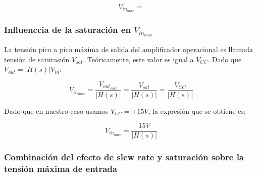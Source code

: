 \begin{equation}
	V_{in_{max}}  = 
\label{vin_max}
\end{equation}


\subsubsection*{Influenccia de la saturaci\'on en $V_{in_{max}}$}
La tensi\'on pico a pico m\'axima de salida del amplificador operacional es llamada 
tensi\'on de saturasi\'on $V_{sat}$. Te\'oricamente, este valor es igual a $V_{CC}$. Dado que $V_{out} = \rvert H(s) \rvert V_{in}$:

\begin{equation}
V_{in_{max}} = \frac{V_{out_{max}}}{\rvert H(s) \rvert} = \frac{V_{sat}}{\rvert H(s) \rvert} = \frac{V_{CC}}{\rvert H(s) \rvert}
\end{equation}

Dado que en nuestro caso usamos $V_{CC} = \pm15V$, la expresi\'on que se obtiene es:

\begin{equation}
V_{in_{max}} = \frac{15V}{\rvert H(s) \rvert} 
\end{equation}



\subsubsection*{Combinaci\'on del efecto de slew rate y saturaci\'on sobre la tensi\'on m\'axima de entrada}

